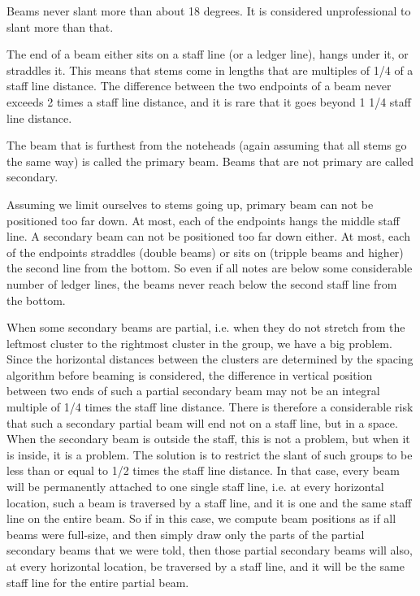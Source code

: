 Beams never slant more than about 18 degrees.  It is considered
unprofessional to slant more than that. 

The end of a beam either sits on a staff line (or a ledger line), hangs
under it, or straddles it.  This means that stems come in lengths that
are multiples of 1/4 of a staff line distance.  The difference between
the two endpoints of a beam never exceeds 2 times a staff line distance,
and it is rare that it goes beyond 1 1/4 staff line distance. 

The beam that is furthest from the noteheads (again assuming that all
stems go the same way) is called the primary beam.  Beams that are not
primary are called secondary. 

Assuming we limit ourselves to stems going up, primary beam can not be
positioned too far down.  At most, each of the endpoints hangs the
middle staff line.  A secondary beam can not be positioned too far down
either.  At most, each of the endpoints straddles (double beams) or sits
on (tripple beams and higher) the second line from the bottom.  So even
if all notes are below some considerable number of ledger lines, the
beams never reach below the second staff line from the bottom. 

When some secondary beams are partial, i.e. when they do not stretch
from the leftmost cluster to the rightmost cluster in the group, we have a
big problem.  Since the horizontal distances between the clusters are
determined by the spacing algorithm before beaming is considered, the
difference in vertical position between two ends of such a partial
secondary beam may not be an integral multiple of 1/4 times the staff
line distance.  There is therefore a considerable risk that such a
secondary partial beam will end not on a staff line, but in a space.
When the secondary beam is outside the staff, this is not a problem, but
when it is inside, it is a problem.  The solution is to restrict the
slant of such groups to be less than or equal to 1/2 times the staff
line distance.  In that case, every beam will be permanently attached to
one single staff line, i.e. at every horizontal location, such a beam is
traversed by a staff line, and it is one and the same staff line on the
entire beam.  So if in this case, we compute beam positions as if all
beams were full-size, and then simply draw only the parts of the partial
secondary beams that we were told, then those partial secondary beams
will also, at every horizontal location, be traversed by a staff
line, and it will be the same staff line for the entire partial beam. 

